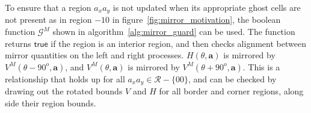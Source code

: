 To ensure that
a region $a_xa_y$ is not updated when its appropriate ghost cells are not present
as in region $-10$ in figure~\ref{fig:mirror_motivation}, the boolean function
$\mathcal{G}^M$ shown in algorithm~\ref{alg:mirror_guard} can be used.  The function
returns $\textsf{true}$ if the region is an interior region, and then checks alignment
between mirror quantities on the left and right processes.  $H(\theta,\mathbf{a})$ is
mirrored by $V^M(\theta - 90^o,\mathbf{a})$, and $V^M(\theta,\mathbf{a})$ is mirrored
by $V^M(\theta + 90^o,\mathbf{a})$.  This is a relationship that holds up for all
$a_xa_y \in \mathcal{R} - \{00\}$, and can be checked by drawing out the rotated bounds
$V$ and $H$ for all border and corner regions, along side their region bounds.



